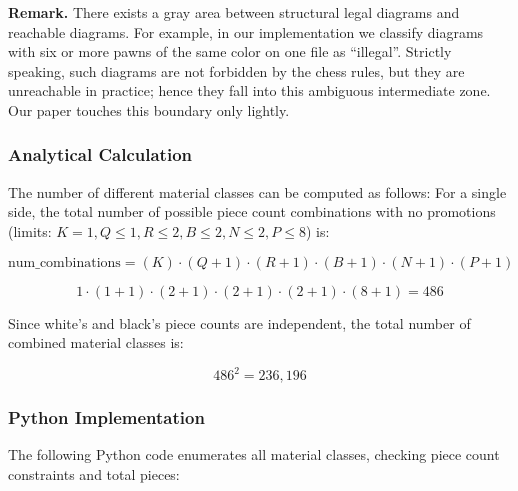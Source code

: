 \documentclass[12pt]{article}
\begin{document}
\noindent
\textbf{Remark.}  
There exists a gray area between structural legal diagrams and reachable diagrams.  
For example, in our implementation we classify diagrams with six or more pawns of the same color on one file as ``illegal''. Strictly speaking, such diagrams are not forbidden by the chess rules, but they are unreachable in practice; hence they fall into this ambiguous intermediate zone. Our paper touches this boundary only lightly.


\subsubsection{Analytical Calculation}

The number of different material classes can be computed as follows: 
For a single side, the total number of possible piece count combinations with no promotions 
(limits: $K = 1, Q \le 1, R \le 2, B \le 2, N \le 2, P \le 8$) is:

\[
\text{num\_combinations} = (K) \cdot (Q + 1) \cdot (R + 1) \cdot (B + 1) \cdot (N + 1) \cdot (P + 1)
\]

\[
1 \cdot (1 + 1) \cdot (2 + 1) \cdot (2 + 1) \cdot (2 + 1) \cdot (8 + 1) = 486
\]

Since white's and black's piece counts are independent, the total number of
combined material classes is:

\[
486^2 = 236{,}196
\]

\subsubsection{Python Implementation}

The following Python code enumerates all material classes, checking piece
count constraints and total pieces:
\end{document}
